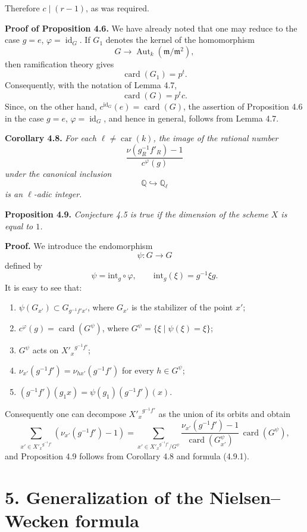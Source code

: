 \documentclass[11pt]{article}
\providecommand{\fm}{\mathfrak{m}}
\providecommand{\car}{\operatorname{car}}
\providecommand{\id}{\operatorname{id}}
\providecommand{\id}{\operatorname{id}}
\providecommand{\id}{\operatorname{id}}
\providecommand{\Aut}{\operatorname{Aut}}
\providecommand{\car}{\operatorname{car}}
\providecommand{\id}{\operatorname{id}}
\providecommand{\id}{\operatorname{id}}
\providecommand{\bQ}{\mathbb Q}
\providecommand{\fm}{\mathfrak m}
\providecommand{\card}{\operatorname{card}}
\providecommand{\Aut}{\operatorname{Aut}}
\providecommand{\car}{\operatorname{car}}
\begin{document}
Therefore $c\mid(r-1)$, as was required.

\medskip
\noindent
\textbf{Proof of Proposition 4.6.} We have already noted that one may reduce to the case $g=e$, $\varphi=\id_G$. If $G_1$ denotes the kernel of the homomorphism
\[
G\longrightarrow\Aut_k(\fm/\fm^2),
\]
then ramification theory gives
\[
\card(G_1)=p^t.
\]
Consequently, with the notation of Lemma 4.7,
\[
\card(G)=p^tc.
\]
Since, on the other hand, $c^{\id_G}(e)=\card(G)$, the assertion of Proposition 4.6 in the case $g=e$, $\varphi=\id_G$, and hence in general, follows from Lemma 4.7.

\medskip
\noindent
\textbf{Corollary 4.8.} \emph{For each $\ell\ne\car(k)$, the image of the rational number
\[
\frac{\nu(g_R^{-1}f'_R)-1}{c^\varphi(g)}
\]
under the canonical inclusion
\[
\bQ\hookrightarrow \bQ_\ell
\]
is an $\ell$-adic integer.}

\medskip
\noindent
\textbf{Proposition 4.9.} \emph{Conjecture 4.5 is true if the dimension of the scheme $X$ is equal to $1$.}

\medskip
\noindent
\textbf{Proof.} We introduce the endomorphism
\[
\psi:G\longrightarrow G
\]
defined by
\[
\psi=\mathrm{int}_g\circ\varphi,
\qquad \mathrm{int}_g(\xi)=g^{-1}\xi g.
\]
It is easy to see that:
\begin{enumerate}
\item[i)] $\psi(G_{x'})\subset G_{g^{-1}f'x'}$, where $G_{x'}$ is the stabilizer of the point $x'$;
\item[ii)] $c^\varphi(g)=\card(G^\psi)$, where $G^\psi=\{\xi\mid\psi(\xi)=\xi\}$;
\item[iii)] $G^\psi$ acts on ${X'_x}^{g^{-1}f'}$;
\item[iv)] $\nu_{x'}(g^{-1}f')=\nu_{hx'}(g^{-1}f')$ for every $h\in G^\psi$;
\item[v)] $(g^{-1}f')(g_1x)=\psi(g_1)(g^{-1}f')(x)$.
\end{enumerate}
Consequently one can decompose ${X'_x}^{g^{-1}f'}$ as the union of its orbits and obtain
\begin{equation}\tag{4.9.1}
\sum_{x'\in {X'_x}^{g^{-1}f'}}(\nu_{x'}(g^{-1}f')-1)
=
\sum_{x'\in {X'_x}^{g^{-1}f'}/G^\psi}
\frac{\nu_{x'}(g^{-1}f')-1}{\card(G^\psi_{x'})}\,\card(G^\psi),
\end{equation}
and Proposition 4.9 follows from Corollary 4.8 and formula (4.9.1).

\section*{5. Generalization of the Nielsen--Wecken formula}
\end{document}

